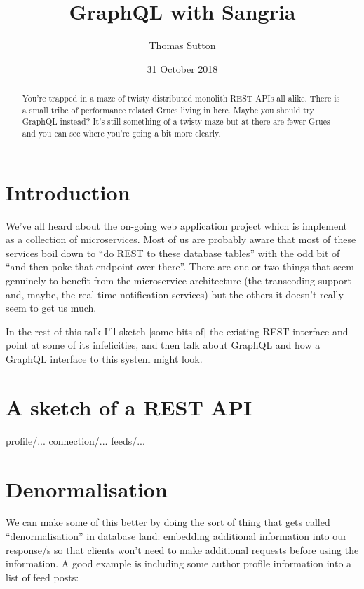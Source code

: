 \documentclass[a4paper]{article}
\title{GraphQL with Sangria}
\author{Thomas Sutton}
\date{31 October 2018}
\begin{document}
\maketitle

\begin{abstract}
  You're trapped in a maze of twisty distributed monolith REST APIs all alike.
  There is a small tribe of performance related Grues living in here. Maybe you
  should try GraphQL instead? It's still something of a twisty maze but at
  there are fewer Grues and you can see where you're going a bit more clearly.
\end{abstract}

\tableofcontents

\section{Introduction}

We've all heard about the on-going web application project which is implement as
a collection of microservices. Most of us are probably aware that most of these
services boil down to ``do REST to these database tables'' with the odd bit of
``and then poke that endpoint over there''. There are one or two things that
seem genuinely to benefit from the microservice architecture (the transcoding
support and, maybe, the real-time notification services) but the others it
doesn't really seem to get us much.

In the rest of this talk I'll sketch [some bits of] the existing REST interface
and point at some of its infelicities, and then talk about GraphQL and how a
GraphQL interface to this system might look.

\section{A sketch of a REST API}

profile/...
connection/...
feeds/...

\section{Denormalisation}

We can make some of this better by doing the sort of thing that gets called
``denormalisation'' in database land: embedding additional information into
our response/s so that clients won't need to make additional requests before
using the information. A good example is including some author profile
information into a list of feed posts:
\end{document}
